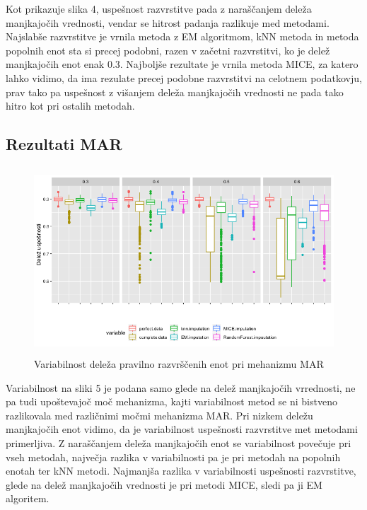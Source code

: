 \documentclass[12pt,a4paper]{article}
\begin{document}
\noindent Kot prikazuje slika 4, uspešnost razvrstitve pada z naraščanjem deleža manjkajočih vrednosti, vendar se hitrost padanja razlikuje med metodami. Najslabše razvrstitve je vrnila metoda z EM algoritmom, kNN metoda in metoda popolnih enot sta si precej podobni, razen v začetni razvrstitvi, ko je delež manjkajočih enot enak 0.3. Najboljše rezultate je vrnila metoda MICE, za katero lahko vidimo, da ima rezulate precej podobne razvrstitvi na celotnem podatkovju, prav tako pa uspešnost z višanjem deleža manjkajočih vrednosti ne pada tako hitro kot pri ostalih metodah.

\pagebreak

\subsection{Rezultati MAR}

\begin{figure}[ht]
	\centering
	\includegraphics[width= 12cm, height = 7cm]{img/MAR_boxplot.png}
	\caption{Variabilnost deleža pravilno razvrščenih enot pri mehanizmu MAR} 
	\label{fig:5}
\end{figure}

\noindent Variabilnost na sliki 5 je podana samo glede na delež manjkajočih vrrednosti, ne pa tudi upoštevajoč moč mehanizma, kajti variabilnost metod se ni bistveno razlikovala med različnimi močmi mehanizma MAR. Pri nizkem deležu manjkajočih enot vidimo, da je variabilnost uspešnosti razvrstitve met metodami primerljiva. Z naraščanjem deleža manjkajočih enot se variabilnost povečuje pri vseh metodah, največja razlika v variabilnosti pa je pri metodah na popolnih enotah ter kNN metodi. Najmanjša razlika v variabilnosti uspešnosti razvrstitve, glede na delež manjkajočih vrednosti je pri metodi MICE, sledi pa ji EM algoritem.
 

\end{document}
